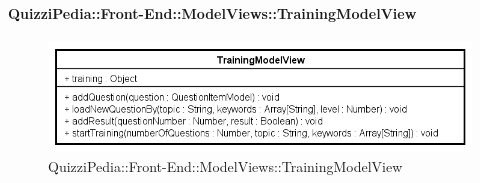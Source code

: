 	\paragraph{QuizziPedia::Front-End::ModelViews::TrainingModelView}
	
	\label{QuizziPedia::Front-End::ModelViews::TrainingModelView}
	
	\begin{figure}[ht]
		\centering
		\includegraphics[scale=0.5,keepaspectratio]{UML/Classi/Front-End/QuizziPedia_Front-end_ModelView_TrainingModelView.png}
		\caption{QuizziPedia::Front-End::ModelViews::TrainingModelView}
	\end{figure} \FloatBarrier
	

